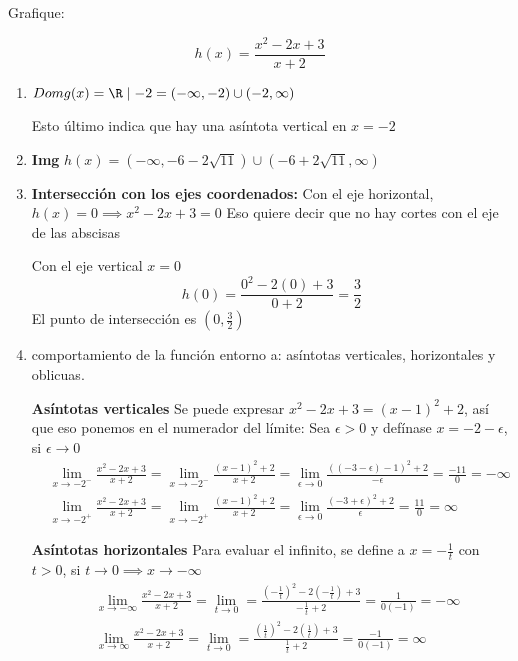\begin{example}
	Grafique:

	\begin{equation*}
		h(x)=\frac{x^2-2x+3}{x+2}
	\end{equation*}

	\begin{enumerate}
		\item $Dom g(x)=\R\mid {-2}= (-\infty, -2)\cup (-2,\infty)$

		      Esto último indica que hay una asíntota vertical en $x=-2$

		\item \textbf{Img} $h(x)=(-\infty, -6-2\sqrt{11})\cup (-6+2\sqrt{11},\infty)$

		\item \textbf{Intersección con los ejes coordenados:}
		      Con el eje horizontal, $h(x)=0\implies x^2-2x+3=0$
		      Eso quiere decir que no hay cortes con el eje de las abscisas

		      Con el eje vertical $x=0$
		      \begin{equation*}
			      h(0)=\frac{0^2-2(0)+3}{0+2}=\frac{3}{2}
		      \end{equation*}
		      El punto de intersección es $(0,\frac{3}{2})$

		\item comportamiento de la función entorno a: asíntotas verticales, horizontales y oblicuas.

		      \textbf{Asíntotas verticales}
		      Se puede expresar $x^2-2x+3=(x-1)^2+2$, así que eso ponemos en el numerador del límite:
		      Sea $\epsilon> 0$ y defínase $x=-2-\epsilon$, si $\epsilon \to 0$
		      \begin{align*}
			       & \lim_{x \to -2^-}\frac{x^2-2x+3}{x+2}=\lim_{x \to -2^-}\frac{(x-1)^2+2}{x+2}=\lim_{\epsilon \to 0} \frac{((-3-\epsilon)-1)^2+2}{-\epsilon}=\frac{-11}{0}=-\infty \\
			       & \lim_{x \to -2^+}\frac{x^2-2x+3}{x+2}=\lim_{x \to -2^+}\frac{(x-1)^2+2}{x+2}=\lim_{\epsilon \to 0}\frac{(-3+\epsilon)^2+2}{\epsilon}=\frac{11}{0}=\infty
		      \end{align*}

		      \textbf{Asíntotas horizontales}
		      Para evaluar el infinito, se define a $x=-\frac{1}{t}$ con $t>0$, si $t\to 0 \implies x\to -\infty$
		      \begin{align*}
			       & \lim_{x \to -\infty}\frac{x^2-2x+3}{x+2}=\lim_{t \to  0} =\frac{\left( -\frac{1}{t} \right)^2-2\left( -\frac{1}{t} \right)+3}{-\frac{1}{t}+2}= \frac{1}{0(-1)}=-\infty \\
			       & \lim_{x \to \infty}\frac{x^2-2x+3}{x+2}=\lim_{t \to  0} =\frac{\left(\frac{1}{t} \right)^2-2\left( \frac{1}{t} \right)+3}{\frac{1}{t}+2}= \frac{-1}{0(-1)}=\infty
		      \end{align*}


\end{enumerate}
\end{example}

